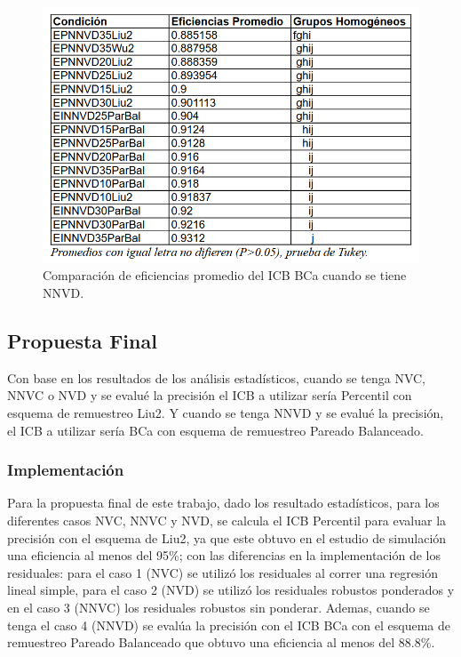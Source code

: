 \begin{figure}[ht] 
	\centering 
	\includegraphics[width=0.76\linewidth]{img/CompEfic_PromICB_BCa_NNVD.png} 
	\caption{Comparación de eficiencias promedio del ICB BCa cuando se tiene NNVD.} 
	\label{fig:CompEfic_PromICB_BCa_NNVD}
\end{figure}
\FloatBarrier



\newpage

\subsection{Propuesta Final}

Con base en los resultados de los análisis estadísticos, cuando se tenga NVC, NNVC o NVD y se evalué la precisión el ICB a utilizar sería Percentil con esquema de remuestreo Liu2. Y cuando se tenga NNVD y se evalué la precisión, el ICB a utilizar sería BCa con esquema de remuestreo Pareado Balanceado.


\subsubsection{Implementación}


Para la propuesta final de este trabajo, dado los resultado estadísticos, para los diferentes casos NVC, NNVC y NVD, se calcula el ICB Percentil para evaluar la precisión con el esquema de Liu2, ya que este obtuvo en el estudio de simulación una eficiencia al menos del 95\%; con las diferencias en la implementación de los residuales: para el caso 1 (NVC) se utilizó los residuales al correr una regresión lineal simple, para el caso 2 (NVD) se utilizó los residuales robustos ponderados y en el caso 3 (NNVC) los residuales robustos sin ponderar. Ademas, cuando se tenga el caso 4 (NNVD) se evalúa la precisión con el ICB BCa con el esquema de remuestreo Pareado Balanceado que obtuvo una eficiencia al menos del 88.8\%.\\

